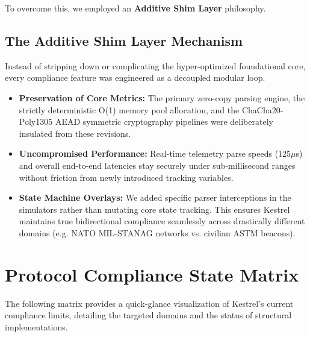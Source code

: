 \documentclass[11pt,a4paper]{article}
\begin{document}
To overcome this, we employed an \textbf{Additive Shim Layer} philosophy.

\subsection{The Additive Shim Layer Mechanism}
Instead of stripping down or complicating the hyper-optimized foundational core, every compliance feature was engineered as a decoupled modular loop.
\begin{itemize}
	\item \textbf{Preservation of Core Metrics:} The primary zero-copy parsing engine, the strictly deterministic O(1) memory pool allocation, and the ChaCha20-Poly1305 AEAD symmetric cryptography pipelines were deliberately insulated from these revisions.
	\item \textbf{Uncompromised Performance:} Real-time telemetry parse speeds (125$\mu$s) and overall end-to-end latencies stay securely under sub-millisecond ranges without friction from newly introduced tracking variables.
	\item \textbf{State Machine Overlays:} We added specific parser interceptions in the simulators rather than mutating core state tracking. This ensures Kestrel maintains true bidirectional compliance seamlessly across drastically different domains (e.g. NATO MIL-STANAG networks vs. civilian ASTM beacons).
\end{itemize}

\section{Protocol Compliance State Matrix}

The following matrix provides a quick-glance visualization of Kestrel's current compliance limits, detailing the targeted domains and the status of structural implementations.
\end{document}
